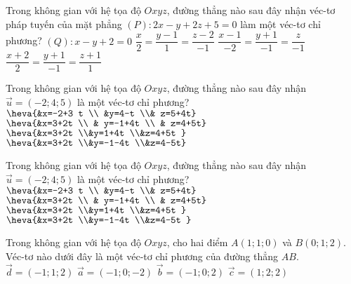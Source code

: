\begin{ex}%
Trong không gian với hệ tọa độ $Oxyz$, đường thẳng nào sau đây nhận véc-tơ pháp tuyến của mặt phẳng $(P) \colon 2x-y+2z+5=0$ làm một véc-tơ chỉ phương?
\choice
{$( Q) \colon x-y+2=0$}
{$\dfrac{x}{2}=\dfrac{y-1}{1}=\dfrac{z-2}{-1}$}
{\True $\dfrac{x-1}{-2}=\dfrac{y+1}{-1}=\dfrac{z}{-1}$}
{$\dfrac{x+2}{2}=\dfrac{y+1}{-1}=\dfrac{z+1}{1}$}
\end{ex}
\begin{ex}%
Trong không gian với hệ tọa độ $Oxyz$, đường thẳng nào sau đây nhận ${\overrightarrow{u}=(-2 ; 4 ; 5)}$ là một véc-tơ chỉ phương?
\choice
{$\heva{&x=-2+3 t \\ &y=4-t \\& z=5+4t}$}
{$\heva{&x=3+2t \\ & y=-1+4t \\ & z=4+5t}$}
{$\heva{&x=3+2t  \\&y=1+4t  \\&z=4+5t }$}
{\True $\heva{&x=3+2t  \\&y=-1-4t  \\&z=4-5t}$}
\end{ex}
\begin{ex}%
	Trong không gian với hệ tọa độ $Oxyz$, đường thẳng nào sau đây nhận $\overrightarrow{u}=(-2;4;5)$ là một véc-tơ chỉ phương?
	\choice
	{$\heva{&x=-2+3 t \\ &y=4-t \\& z=5+4t}$}
	{$\heva{&x=3+2t \\ & y=-1+4t \\ & z=4+5t}$}
	{$\heva{&x=3+2t  \\&y=1+4t  \\&z=4+5t }$}
	{\True $\heva{&x=3+2t  \\&y=-1-4t  \\&z=4-5t }$}
\end{ex}
\begin{ex}%
Trong không gian với hệ tọa độ $Oxyz$, cho hai điểm $A(1;1;0)$ và $B( 0;1;2 )$. Véc-tơ nào dưới đây là một véc-tơ chỉ phương của đường thẳng $AB$.
		\choice
		{ $\overrightarrow{d}=(-1;1;2)$}
		{ $\overrightarrow{a}=(-1;0;-2)$}
		{\True $\overrightarrow{b}=(-1;0;2)$}
		{ $\overrightarrow{c}=( 1;2;2)$}
\end{ex}
